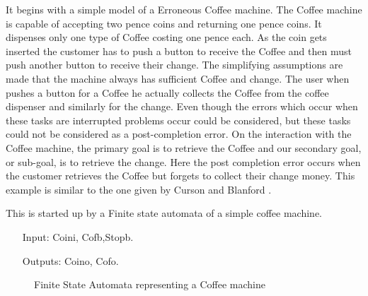 \documentclass[a4paper,10pt]{report}
\begin{document}
It begins with a simple model of a Erroneous Coffee machine. The Coffee machine is capable of accepting two pence coins and returning one pence coins. It dispenses only one type of Coffee costing one pence each. As the coin gets inserted the customer has to push a button to receive the Coffee and then must push another button to receive their change. The simplifying assumptions are made that the machine always has sufficient Coffee and change. The user when pushes a button for a Coffee he actually collects the Coffee from the coffee dispenser and similarly for the change. Even though the errors which occur when these tasks are interrupted problems occur could be considered, but these tasks could not be considered as a post-completion error. On the interaction with the Coffee machine, the primary goal is to retrieve the Coffee and our secondary goal, or sub-goal, is to retrieve the change. Here the post completion error occurs when the customer retrieves the Coffee but forgets to collect their change money. This example is similar to the one given by Curson and Blanford \cite{P.Curson}.

This is started up by a Finite state automata of a simple coffee machine.

\begin{itemize}
\item[Input:] Coini, Cofb,Stopb.
\item[Outputs:]Coino, Cofo.
\end{itemize}
\begin{figure}[h!]
\centering
{}
 \caption{Finite State Automata representing a Coffee machine}
\end{figure}
\end{document}
